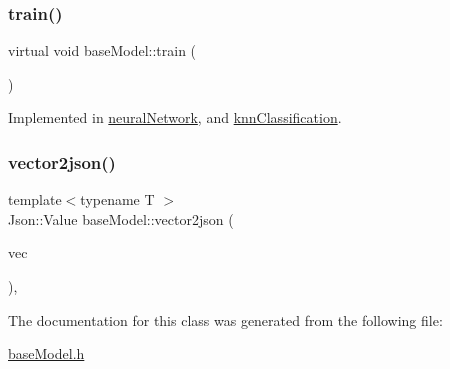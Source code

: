 \subsubsection{\texorpdfstring{train()}{train()}}
{\footnotesize\ttfamily virtual void base\+Model\+::train (\begin{DoxyParamCaption}\item[{std\+::vector$<$ \hyperlink{structtraining_example}{training\+Example} $>$}]{ }\end{DoxyParamCaption})\hspace{0.3cm}{\ttfamily [pure virtual]}}



Implemented in \hyperlink{classneural_network_aae35def98392b0d0a51f2c82afc48efc}{neural\+Network}, and \hyperlink{classknn_classification_ae159e53f542d08d04c76760f2e25e843}{knn\+Classification}.

\mbox{\label{classbase_model_a853d3a2d610c43fca37676ac1459e3b9}} 
\subsubsection{\texorpdfstring{vector2json()}{vector2json()}}
{\footnotesize\ttfamily template$<$typename T $>$ \\
Json\+::\+Value base\+Model\+::vector2json (\begin{DoxyParamCaption}\item[{T}]{vec }\end{DoxyParamCaption})\hspace{0.3cm}{\ttfamily [inline]}, {\ttfamily [protected]}}



The documentation for this class was generated from the following file\+:\begin{DoxyCompactItemize}
\item 
\hyperlink{base_model_8h}{base\+Model.\+h}\end{DoxyCompactItemize}

